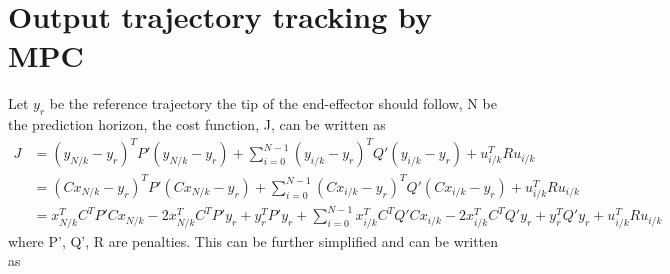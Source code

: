 \documentclass[french]{article}
\begin{document}
	\section{Output trajectory tracking by MPC}
	Let $y_r$ be the reference trajectory the tip of the end-effector should follow, N be the prediction horizon, the cost function, J, can be written as
	\begin{align}
	J &= (y_{N/k} - y_r)^T P' (y_{N/k} - y_r) + \sum_{i=0}^{N-1} (y_{i/k} - y_r)^T Q' (y_{i/k} - y_r) + u_{i/k}^T R u_{i/k} \\
	&= (Cx_{N/k} - y_r)^T P' (Cx_{N/k} - y_r) + \sum_{i=0}^{N-1} (Cx_{i/k} - y_r)^T Q' (Cx_{i/k} - y_r) + u_{i/k}^T R u_{i/k}	\nonumber \\
	&= x_{N/k}^T C^TP'C x_{N/k} -  2 x_{N/k}^T C^TP' y_r + y_r^TP'y_r + \sum_{i=0}^{N-1} x_{i/k}^T C^TQ'C x_{i/k} - 2 x_{i/k}^TC^TQ'y_r + y_r^TQ'y_r + u_{i/k}^T R u_{i/k}
	\end{align}
	where P', Q', R are penalties.
	This can be further simplified and can be written as
\end{document}
